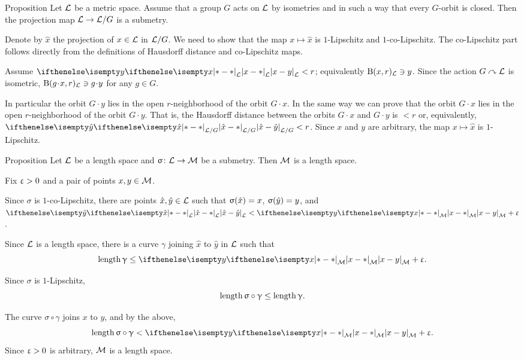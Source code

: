 \begin{thm}{Proposition}\label{prop:submet/G}
Let $\mathcal{L}$ be a metric space.
Assume that a group $G$  acts on $\mathcal{L}$ by isometries  
and in such a way that every $G$-orbit is closed.
Then the projection map $\spc{L}\to \spc{L}/G$ is a submetry.
\end{thm}

Denote by $\hat x$ the projection of $x\in \spc{L}$ in $\mathcal{L}/G$.
We need to show that the map $x\mapsto\hat x$ is $1$-Lipschitz and $1$-co-Lipschitz.
The co-Lipschitz part follows directly from the definitions of Hausdorff distance and co-Lipschitz maps.

Assume $\dist{x}{y}{\spc{L}}< r$; equivalently $\mathrm{B}{}(x,r)_{\mathcal{L}}\ni y$.
Since the action $G\curvearrowright \mathcal{L}$ is isometric, 
$\oBall(g\cdot x,r)_{\spc{L}}\ni g\cdot y$ for any $g\in G$.

In particular the orbit $G\cdot y$ lies in the open $r$-neighborhood of the orbit $G\cdot x$.
In the same way we can prove that the orbit $G\cdot x$ lies in the open $r$-neighborhood of the orbit $G\cdot y$. 
That is, the Hausdorff distance between the orbits $G\cdot x$ and $G\cdot y$ is  $<r$
or, equivalently, $\dist{\hat x}{\hat y}{\spc{L}/G}< r$.
Since $x$ and $y$ are arbitrary, the map $x\mapsto\hat x$ is $1$-Lipschitz.
\qeds


\begin{thm}{Proposition}
\label{prop:submet-length}
Let  $\mathcal{L}$ be a length space 
and $\sigma\:\spc{L}\to \spc{M}$ be a submetry.
Then $\mathcal{M}$ is a length space.
\end{thm}

Fix $\upvarepsilon>0$ and a pair of points $x,y\in \spc{M}$.

Since $\sigma$ is $1$-co-Lipschitz, there are points $\hat x,\hat y\in \spc{L}$
such that 
$\sigma(\hat x)\z=x$,
$\sigma(\hat y)\z=y$, 
and $\dist{\hat x}{\hat y}{\spc{L}}<\dist{x}{y}{\spc{M}}+\eps$.

Since ${\mathcal{L}}$ is a length space, 
there is a curve $\gamma$ 
joining $\hat x$ to $\hat y$ in ${\mathcal{L}}$
such that
\[\length\gamma\le \dist{x}{y}{\spc{M}}+\eps.\]

Since $\sigma$ is $1$-Lipschitz,
\[\length\sigma\circ\gamma\le \length\gamma.\]

The curve $\sigma\circ\gamma$ joins $x$ to $y$,
and by the above,
\[\length\sigma\circ\gamma<\dist{x}{y}{\spc{M}}+\eps.\]
Since $\upvarepsilon>0$ is arbitrary,
$\mathcal{M}$ is a length space.
\qeds

